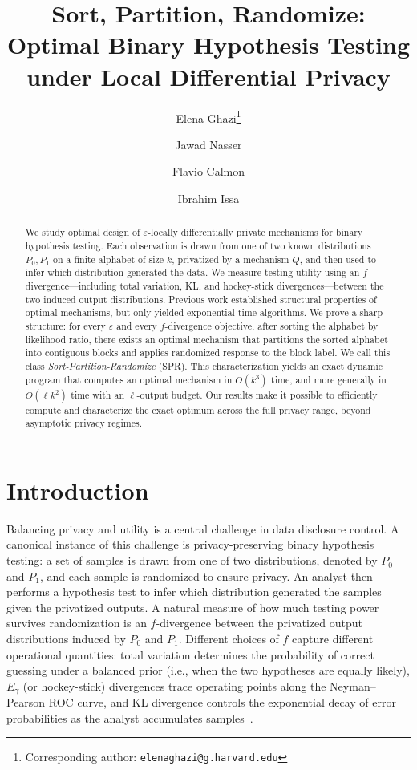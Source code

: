 \documentclass{article}
\title{Sort, Partition, Randomize: Optimal Binary Hypothesis Testing under Local Differential Privacy}
\author[1]{Elena Ghazi\thanks{Corresponding author: \texttt{elenaghazi@g.harvard.edu}}}
\author[2]{Jawad Nasser}
\author[1]{Flavio Calmon}
\author[2]{Ibrahim Issa}
\affil[1]{Harvard University}
\affil[2]{American University of Beirut}
\date{}
\theoremstyle{plain}
\theoremstyle{definition}
\theoremstyle{plain}
\begin{document}
\maketitle

\begin{abstract}
We study optimal design of $\varepsilon$-locally differentially private mechanisms for binary hypothesis testing. Each observation is drawn from one of two known distributions $P_0,P_1$ on a finite alphabet of size $k$, privatized by a mechanism $Q$, and then used to infer which distribution generated the data. We measure testing utility using an $f$-divergence---including total variation, KL, and hockey-stick divergences---between the two induced output distributions. Previous work established structural properties of optimal mechanisms, but only yielded exponential-time algorithms. We prove a sharp structure: for every $\varepsilon$ and every $f$-divergence objective, after sorting the alphabet by likelihood ratio, there exists an optimal mechanism that partitions the sorted alphabet into contiguous blocks and applies randomized response to the block label. We call this class \emph{Sort-Partition-Randomize} (SPR). This characterization yields an exact dynamic program that computes an optimal mechanism in $O(k^3)$ time, and more generally in $O(\ell k^2)$ time with an $\ell$-output budget. Our results make it possible to efficiently compute and characterize the exact optimum across the full privacy range, beyond asymptotic privacy regimes.

\end{abstract}

\tableofcontents
\newpage

\section{Introduction}
\label{sec:introduction}

Balancing privacy and utility is a central challenge in data disclosure control.
A canonical instance of this challenge is privacy-preserving binary hypothesis testing: a set of samples is drawn from one of two distributions, denoted by $P_0$ and $P_1$, and each sample is randomized to ensure privacy.
An analyst then performs a hypothesis test to infer which distribution generated the samples given the privatized outputs.
A natural measure of how much testing power survives randomization is an $f$-divergence between the privatized output distributions induced by $P_0$ and $P_1$.
Different choices of $f$ capture different operational quantities: total variation determines the probability of correct guessing under a balanced prior (i.e., when the two hypotheses are equally likely), $E_\gamma$ (or hockey-stick) divergences trace operating points along the Neyman--Pearson ROC curve, and KL divergence controls the exponential decay of error probabilities as the analyst accumulates samples~\cite{Duchi2013MinimaxRates,Asoodeh2021EGammaContraction,Pensia2025BinaryTesting}.
\end{document}
